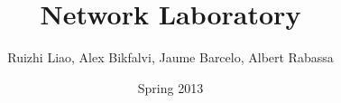 \documentclass[a4paper,11pt]{book}
\begin{document}
\frontmatter
\pagestyle{empty}

\title{\Huge Network Laboratory}
\author{Ruizhi Liao, Alex Bikfalvi, Jaume Barcelo, Albert Rabassa}
\date{Spring 2013}
\maketitle

\tableofcontents

\mainmatter







\backmatter


\end{document}
